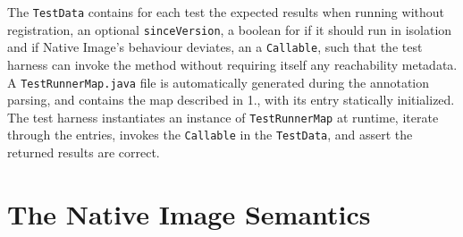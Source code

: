 The \verb|TestData| contains for each test the expected results when running without registration, an optional \verb|sinceVersion|, a boolean for if it should run in isolation and if Native Image's behaviour deviates, an a \verb|Callable|, such that the test harness can invoke the method without requiring itself any reachability metadata.  
A \verb|TestRunnerMap.java| file is automatically generated during the annotation parsing, and contains the map described in 1., with its entry statically initialized. 
The test harness instantiates an instance of \verb|TestRunnerMap| at runtime, iterate through the entries, invokes the \verb|Callable| in the \verb|TestData|, and assert the returned results are correct.




\chapter{The Native Image Semantics}\label{native_image_specs}



